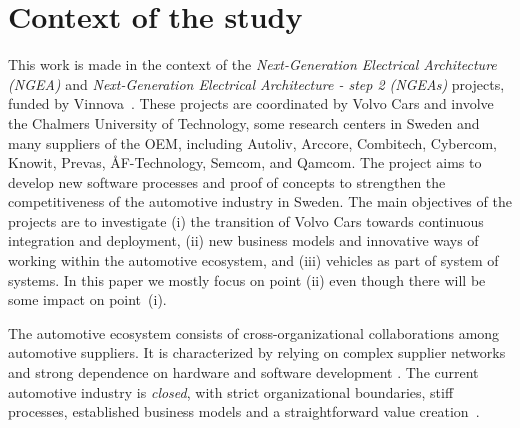 \section{Context of the study}\label{sec:context}


This work is made in the context of the {\em Next-Generation Electrical Architecture (NGEA)} and {\em Next-Generation Electrical Architecture - step 2 (NGEAs)} projects, funded by Vinnova~\cite{Vinnova}. 
These projects are coordinated by Volvo Cars and involve the Chalmers University of Technology, some research centers in Sweden and many suppliers of the OEM, including Autoliv, Arccore, Combitech, Cybercom, Knowit, Prevas, \AA F-Technology, Semcom, and Qamcom. The project aims to develop new software processes and proof of concepts to strengthen the competitiveness of the automotive industry in Sweden. The main objectives of the projects are to investigate (i) the transition of Volvo Cars towards continuous integration and deployment, (ii) new business models and innovative ways of working within the automotive ecosystem, and (iii) vehicles as part of system of systems. 
In this paper we mostly focus on point (ii) even though there will be some impact on point~(i). 

The automotive ecosystem consists of cross-organizational collaborations among automotive suppliers. It is characterized by relying on complex supplier networks and strong dependence on hardware and software development \cite{Patrizio2016AAF_Chalmers,Knauss14d.:towards,Broy:2006:CAS:1134285.1134292}.
The current automotive industry is {\em closed}, with strict organizational boundaries, stiff processes, established business models and a straightforward value creation~\cite{ConnectedVehicle2012}.


